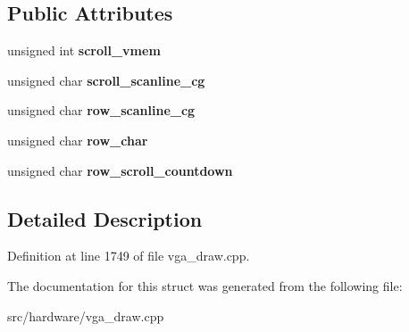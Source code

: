 \subsection*{Public Attributes}
\begin{DoxyCompactItemize}
\item 
\hypertarget{structText__Draw__State_a72dcde92c1d0b0338acc888a51f30914}{unsigned int {\bfseries scroll\-\_\-vmem}}\label{structText__Draw__State_a72dcde92c1d0b0338acc888a51f30914}

\item 
\hypertarget{structText__Draw__State_ad34090de4ca22fb0777f5eb7056cf5e9}{unsigned char {\bfseries scroll\-\_\-scanline\-\_\-cg}}\label{structText__Draw__State_ad34090de4ca22fb0777f5eb7056cf5e9}

\item 
\hypertarget{structText__Draw__State_a699f693c31130b23e9ba2380e8c80f20}{unsigned char {\bfseries row\-\_\-scanline\-\_\-cg}}\label{structText__Draw__State_a699f693c31130b23e9ba2380e8c80f20}

\item 
\hypertarget{structText__Draw__State_a806bd82f87fd54eb3186dabad62f5771}{unsigned char {\bfseries row\-\_\-char}}\label{structText__Draw__State_a806bd82f87fd54eb3186dabad62f5771}

\item 
\hypertarget{structText__Draw__State_a013c45ffb9b60f0dc579952522746518}{unsigned char {\bfseries row\-\_\-scroll\-\_\-countdown}}\label{structText__Draw__State_a013c45ffb9b60f0dc579952522746518}

\end{DoxyCompactItemize}


\subsection{Detailed Description}


Definition at line 1749 of file vga\-\_\-draw.\-cpp.



The documentation for this struct was generated from the following file\-:\begin{DoxyCompactItemize}
\item 
src/hardware/vga\-\_\-draw.\-cpp\end{DoxyCompactItemize}
